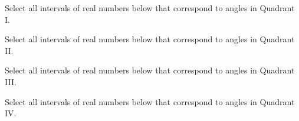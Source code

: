 \documentclass{ximera}
\author{Kenneth Berglund}
\begin{document}
\begin{exercise}
Select all intervals of real numbers below that correspond to angles in Quadrant I. 
\begin{selectAll}
\end{selectAll}

Select all intervals of real numbers below that correspond to angles in Quadrant II. 
\begin{selectAll}
\end{selectAll}

Select all intervals of real numbers below that correspond to angles in Quadrant III. 
\begin{selectAll}
\end{selectAll}

Select all intervals of real numbers below that correspond to angles in Quadrant IV. 
\begin{selectAll}
\end{selectAll}

\end{exercise}
\end{document}

